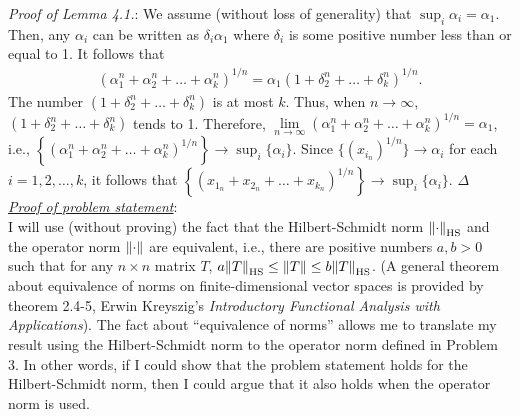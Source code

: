 \documentclass[11pt]{article}
\begin{document}
\noindent \textit{Proof of Lemma 4.1.}: We assume (without loss of generality) that $\sup_{i} \alpha_i = \alpha_1$. Then, any $\alpha_i$ can be written as $\delta_i \alpha_1$ where $\delta_i$ is some positive number less than or equal to 1. It follows that
\begin{align*}
(\alpha_1^n+ \alpha_2^n+ \dots + \alpha_k^n)^{1/n} = \alpha_1 (1 + \delta_2^n + \dots + \delta_k^n)^{1/n}.
\end{align*}
The number $(1 + \delta_2^n + \dots + \delta_k^n)$ is at most $k$. Thus, when $n\to \infty$, $(1 + \delta_2^n + \dots + \delta_k^n)$ tends to 1. Therefore, $\lim\limits_{n\to\infty} (\alpha_1^n+ \alpha_2^n+ \dots + \alpha_k^n)^{1/n} = \alpha_1 $, i.e., $
\left\{ (\alpha_1^n+ \alpha_2^n+ \dots + \alpha_k^n)^{1/n} \right\} \to \sup_{i}\{\alpha_i\}$. Since $ \{(x_{i_n})^{1/n}\} \to \alpha_i$ for each $i=1,2,\dots,k$, it follows that $\left\{ (x_{1_n}+ x_{2_n}+ \dots + x_{k_n})^{1/n} \right\} \to \sup_{i}\{\alpha_i \}$. \hfill $\Delta$\\


\noindent \underline{\textit{Proof of problem statement}}: \\


I will use (without proving) the fact that the Hilbert-Schmidt norm $\norm{ \cdot }_{\text{HS}}$ and the operator norm $\norm{\cdot}$ are equivalent, i.e., there are positive numbers $a,b> 0$ such that for any $n\times n$ matrix $T$, $a\norm{T}_{\text{HS}} \leq \norm{T} \leq b\norm{T}_{\text{HS}}$. (A general theorem about equivalence of norms on finite-dimensional vector spaces is provided by theorem 2.4-5, Erwin Kreyszig's \textit{Introductory Functional Analysis with Applications}). The fact about ``equivalence of norms'' allows me to translate my result using the Hilbert-Schmidt norm to the operator norm defined in Problem 3. In other words, if I could show that the problem statement holds for the Hilbert-Schmidt norm, then I could argue that it also holds when the operator norm is used.  
$\,$\\
\end{document}
